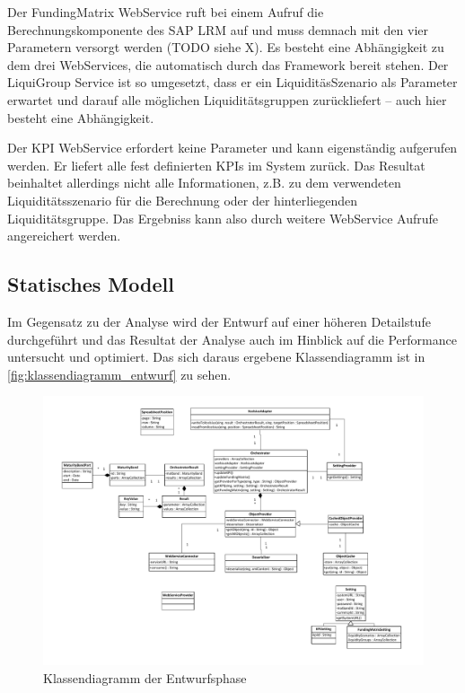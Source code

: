 Der FundingMatrix WebService ruft bei einem Aufruf die Berechnungskomponente des SAP LRM auf und muss demnach mit den vier Parametern versorgt werden (TODO siehe X). Es besteht eine Abhängigkeit zu dem drei WebServices, die automatisch durch das Framework  bereit stehen. Der LiquiGroup Service ist so umgesetzt, dass er ein LiquiditäsSzenario als Parameter erwartet und darauf alle möglichen Liquiditätsgruppen zurückliefert -- auch hier besteht eine Abhängigkeit.

Der KPI WebService erfordert keine Parameter und kann eigenständig aufgerufen werden. Er liefert alle fest definierten KPIs im System zurück. Das Resultat beinhaltet allerdings nicht alle Informationen, z.B. zu dem verwendeten Liquiditätsszenario für die Berechnung oder der hinterliegenden Liquiditätsgruppe. Das Ergebniss kann also durch weitere WebService Aufrufe angereichert werden.

\subsection{Statisches Modell}
Im Gegensatz zu der Analyse wird der Entwurf auf einer höheren Detailstufe durchgeführt und das Resultat der Analyse auch im Hinblick auf die Performance untersucht und optimiert. Das sich daraus ergebene Klassendiagramm ist in \vref{fig:klassendiagramm_entwurf} zu sehen.

\begin{figure}[h]
\centering
\setlength{\unitlength}{1mm}
\includegraphics[width=15cm]{Visio/Entwurf.pdf}
\caption{Klassendiagramm der Entwurfsphase\label{fig:klassendiagramm_entwurf}}
\end{figure}

